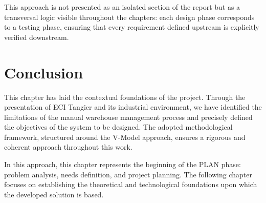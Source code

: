 This approach is not presented as an isolated section of the report but as a transversal logic visible throughout the chapters: each design phase corresponds to a testing phase, ensuring that every requirement defined upstream is explicitly verified downstream.

\section{Conclusion}
\label{sec:ch1-conclusion}

This chapter has laid the contextual foundations of the project. Through the presentation of ECI Tangier and its industrial environment, we have identified the limitations of the manual warehouse management process and precisely defined the objectives of the system to be designed. The adopted methodological framework, structured around the V-Model approach, ensures a rigorous and coherent approach throughout this work.

In this approach, this chapter represents the beginning of the PLAN phase: problem analysis, needs definition, and project planning. The following chapter focuses on establishing the theoretical and technological foundations upon which the developed solution is based.
